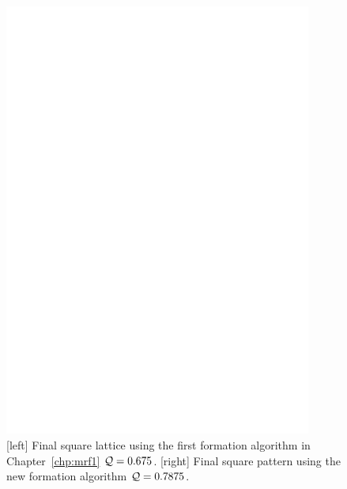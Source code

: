 \begin{figure}
\begin{minipage}{0.45\linewidth}
            \includegraphics[width=0.9\textwidth]{figs/sq40_new}
        \end{minipage}
        \caption{[left] Final square lattice using the first formation algorithm in Chapter~\ref{chp:mrf1} $\mathcal{Q}=0.675$. [right] Final square pattern using the new formation algorithm $\mathcal{Q}=0.7875$.}
        \label{fig:forty_sq_comp}
    \end{figure}
